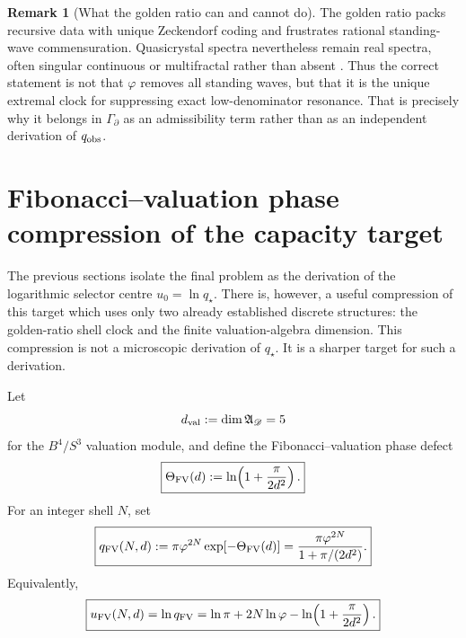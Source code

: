 \documentclass[aps,prd,reprint,nofootinbib,superscriptaddress,floatfix]{revtex4-2}
\numberwithin{equation}{section}
\theoremstyle{definition}
\newtheorem{remark}{Remark}[section]
\theoremstyle{plain}
\begin{document}
\begin{remark}[What the golden ratio can and cannot do]
The golden ratio packs recursive data with unique Zeckendorf coding and
frustrates rational standing-wave commensuration.  Quasicrystal spectra
nevertheless remain real spectra, often singular continuous or
multifractal rather than absent \cite{Senechal1995,Jagannathan2021}.
Thus the correct statement is not that \(\varphi\) removes all standing
waves, but that it is the unique extremal clock for suppressing exact
low-denominator resonance.  That is precisely why it belongs in
\(\Gamma_\partial\) as an admissibility term rather than as an independent
derivation of \(q_{\rm obs}\).
\end{remark}






\section{Fibonacci--valuation phase compression of the capacity target}
\label{sec:fib-val-phase-compression}

The previous sections isolate the final problem as the derivation of the logarithmic selector centre \(u_0=\ln q_\star\).  There is, however, a useful compression of this target which uses only two already established discrete structures: the golden-ratio shell clock and the finite valuation-algebra dimension.  This compression is not a microscopic derivation of \(q_\star\).  It is a sharper target for such a derivation.

Let
\begin{equation}
d_{\rm val}:=\dim\mathfrak A_{\mathscr D}=5
\end{equation}
for the \(B^4/S^3\) valuation module, and define the Fibonacci--valuation phase defect
\begin{equation}
\boxed{
\Theta_{\rm FV}(d):=\ln\!\left(1+\frac{\pi}{2d^2}\right).
}
\end{equation}
For an integer shell \(N\), set
\begin{equation}
\boxed{
q_{\rm FV}(N,d)
:=
\pi\varphi^{2N}\exp[-\Theta_{\rm FV}(d)]
=
\frac{\pi\varphi^{2N}}{1+\pi/(2d^2)} .
}
\label{eq:qFV}
\end{equation}
Equivalently,
\begin{equation}
\boxed{
u_{\rm FV}(N,d)
=
\ln q_{\rm FV}
=
\ln\pi+2N\ln\varphi-\ln\!\left(1+\frac{\pi}{2d^2}\right).
}
\end{equation}
\end{document}
